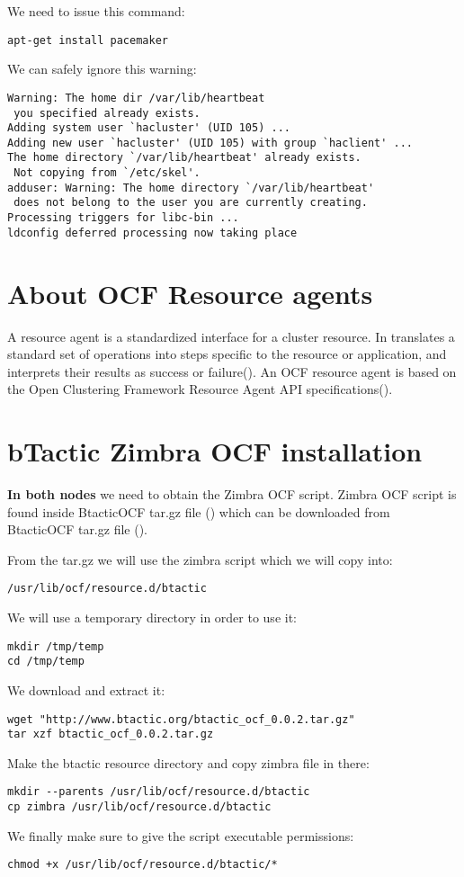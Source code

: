 We need to issue this command:
\begin{verbatim}
apt-get install pacemaker
\end{verbatim}

We can safely ignore this warning:
\begin{verbatim}
Warning: The home dir /var/lib/heartbeat
 you specified already exists.
Adding system user `hacluster' (UID 105) ...
Adding new user `hacluster' (UID 105) with group `haclient' ...
The home directory `/var/lib/heartbeat' already exists.
 Not copying from `/etc/skel'.
adduser: Warning: The home directory `/var/lib/heartbeat'
 does not belong to the user you are currently creating.
Processing triggers for libc-bin ...
ldconfig deferred processing now taking place
\end{verbatim}

\section {About OCF Resource agents}
A resource agent is a standardized interface for a cluster resource. In translates a standard set of operations into steps specific to the resource or application, and interprets their results as success or failure(\cite{ResourceAgentsWiki}). An OCF resource agent is based on the Open Clustering Framework Resource Agent API specifications(\cite{OCFResourceAgentsWiki}). 

\section {bTactic Zimbra OCF installation}
\textbf{In both nodes} we need to obtain the Zimbra OCF script. Zimbra OCF script is found inside BtacticOCF tar.gz file (\cite{BtacticOCF}) which can be downloaded from BtacticOCF  tar.gz file (\cite{BtacticOrg}).

From the tar.gz we will use the zimbra script which we will copy into:
\begin{verbatim}
/usr/lib/ocf/resource.d/btactic
\end{verbatim}

We will use a temporary directory in order to use it:
\begin{verbatim}
mkdir /tmp/temp
cd /tmp/temp
\end{verbatim}
We download and extract it:
\begin{verbatim}
wget "http://www.btactic.org/btactic_ocf_0.0.2.tar.gz"
tar xzf btactic_ocf_0.0.2.tar.gz
\end{verbatim}
Make the btactic resource directory and copy zimbra file in there:
\begin{verbatim}
mkdir --parents /usr/lib/ocf/resource.d/btactic
cp zimbra /usr/lib/ocf/resource.d/btactic
\end{verbatim}
We finally make sure to give the script executable permissions:
\begin{verbatim}
chmod +x /usr/lib/ocf/resource.d/btactic/*
\end{verbatim}

